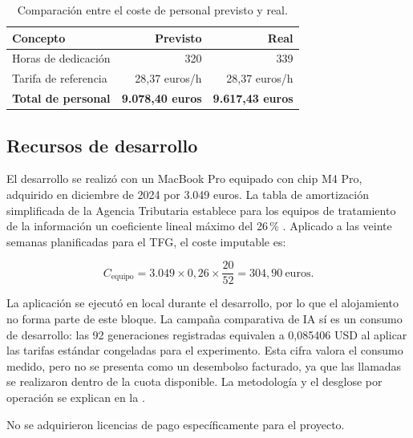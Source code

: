 \begin{table}[H]
  \centering
  \small
  \caption{Comparación entre el coste de personal previsto y real.}
  \label{tab:personnel-cost}
  \begin{tabular}{@{}lrr@{}}
    \toprule
    \textbf{Concepto} & \textbf{Previsto} & \textbf{Real} \\
    \midrule
    Horas de dedicación & 320 & 339 \\
    Tarifa de referencia & 28,37 euros/h & 28,37 euros/h \\
    \midrule
    \textbf{Total de personal} & \textbf{9{.}078,40 euros} & \textbf{9{.}617,43 euros} \\
    \bottomrule
  \end{tabular}
\end{table}

\subsection{Recursos de desarrollo}

El desarrollo se realizó con un MacBook Pro equipado con chip M4 Pro, adquirido
en diciembre de 2024 por 3{.}049 euros. La tabla de amortización simplificada de
la Agencia Tributaria establece para los equipos de tratamiento de la
información un coeficiente lineal máximo del 26\,\%
\cite{aeatAmortizacion}. Aplicado a las veinte semanas planificadas para el TFG,
el coste imputable es:

\begin{equation}
  C_{\text{equipo}} = 3{.}049 \times 0{,}26 \times \frac{20}{52}
  = 304{,}90~\text{euros}.
\end{equation}

La aplicación se ejecutó en local durante el desarrollo, por lo que el
alojamiento no forma parte de este bloque. La campaña comparativa de IA sí es
un consumo de desarrollo: las 92 generaciones registradas equivalen a
0,085406 USD al aplicar las tarifas estándar congeladas para el experimento.
Esta cifra valora el consumo medido, pero no se presenta como un desembolso
facturado, ya que las llamadas se realizaron dentro de la cuota disponible.
La metodología y el desglose por operación se explican en la
.

No se adquirieron licencias de pago específicamente para el proyecto.

